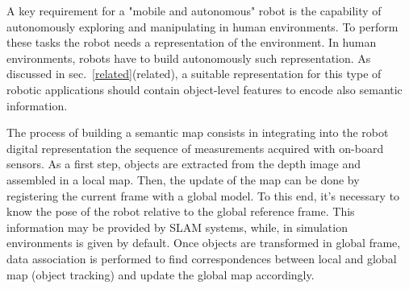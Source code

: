 \documentclass{article}
\begin{document}
%	
%	


A key requirement for a "mobile and autonomous" robot is the capability of autonomously exploring and manipulating in human environments. To perform these tasks the robot needs a representation of the environment. In human environments, robots have to build autonomously such representation. As discussed in sec.~\ref{related}(related), a suitable representation for this type of robotic applications should contain object-level features to encode also semantic information. 

The process of building a semantic map consists in integrating into the robot digital representation the sequence of measurements acquired with on-board sensors. As a first step, objects are extracted from the depth image and assembled in a local map. Then, the update of the map can be done by registering the current frame with a global model. To this end, it's necessary to know the pose of the robot relative to the global reference frame. This information may be provided by SLAM systems, while, in simulation environments is given by default. Once objects are transformed in global frame, data association is performed to find correspondences between local and global map (object tracking) and update the global map accordingly.
	
\end{document}
